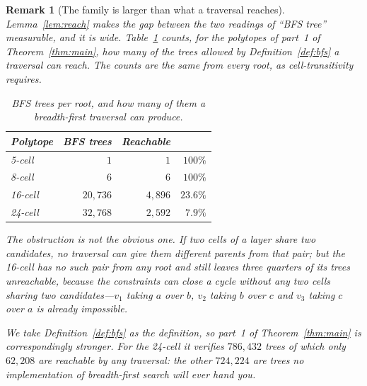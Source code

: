 \documentclass[11pt,letterpaper]{article}
\newtheorem{remark}{Remark}
\begin{document}
\begin{remark}[The family is larger than what a traversal reaches]
\label{rem:family}
Lemma~\ref{lem:reach} makes the gap between the two readings of ``BFS
tree'' measurable, and it is wide.
Table~\ref{tab:reach} counts, for the polytopes of part~1 of
Theorem~\ref{thm:main}, how many of the trees allowed by
Definition~\ref{def:bfs} a traversal can reach.
The counts are the same from every root, as cell-transitivity requires.

\begin{table}[ht]
\centering
\caption{BFS trees per root, and how many of them a breadth-first
  traversal can produce.}
\label{tab:reach}
\begin{tabular}{lrrr}
\toprule
Polytope & BFS trees & Reachable & \\
\midrule
5-cell  & $1$      & $1$     & $100\%$\\
8-cell  & $6$      & $6$     & $100\%$\\
16-cell & $20{,}736$ & $4{,}896$ & $23.6\%$\\
24-cell & $32{,}768$ & $2{,}592$ & $7.9\%$\\
\bottomrule
\end{tabular}
\end{table}

\noindent
The obstruction is not the obvious one.
If two cells of a layer share two candidates, no traversal can give
them different parents from that pair; but the 16-cell has no such
pair from any root and still leaves three quarters of its trees
unreachable, because the constraints can close a cycle without any two
cells sharing two candidates---$v_1$ taking $a$ over $b$, $v_2$ taking
$b$ over $c$ and $v_3$ taking $c$ over $a$ is already impossible.

We take Definition~\ref{def:bfs} as the definition, so part~1 of
Theorem~\ref{thm:main} is correspondingly stronger.
For the 24-cell it verifies $786{,}432$ trees of which only $62{,}208$
are reachable by any traversal: the other $724{,}224$ are trees no
implementation of breadth-first search will ever hand you.
\end{remark}
\end{document}
